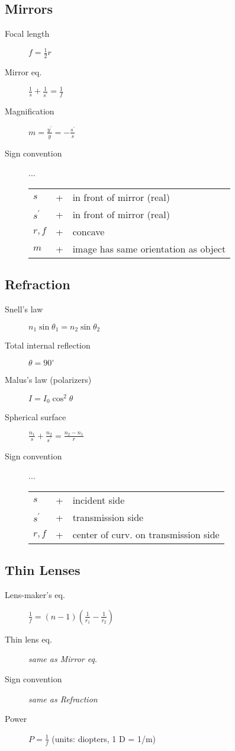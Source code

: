 \documentclass{article}
\newcommand{\bd}{\begin{description}}
\newcommand{\ed}{\end{description}}
\begin{document}
\subsection{Mirrors}
\bd
 \item[Focal length] $ f = \frac{1}{2} r $
 \item[Mirror eq.] $ \frac{1}{s} + \frac{1}{s^\prime} = \frac{1}{f} $
 \item[Magnification] $ m = \frac{y^\prime}{y} = - \frac{s^\prime}{s} $
 \item[Sign convention] ...\newline
  \begin{tabular}{lll}
   $s$ & + & in front of mirror (real) \\
   $s^\prime$ & + & in front of mirror (real) \\
   $r,f$ & + & concave \\
   $m$ & + & image has same orientation as object
  \end{tabular}
\ed

\subsection{Refraction}
\bd
 \item[Snell's law] $ n_1 \sin\theta_1 = n_2 \sin\theta_2 $
 \item[Total internal reflection] $ \theta = 90^\circ $
 \item[Malus's law (polarizers)] $ I = I_0 \cos^2 \theta $
 \item[Spherical surface] $ \frac{n_1}{s} + \frac{n_2}{s^\prime} = \frac{n_2 - n_1}{r} $
 \item[Sign convention] ...\newline
  \begin{tabular}{lll}
   $s$ & + & incident side \\
   $s^\prime$ & + & transmission side \\
   $r,f$ & + & center of curv. on transmission side
  \end{tabular}
\ed

\subsection{Thin Lenses}
\bd
 \item[Lens-maker's eq.] $ \frac{1}{f} = (n-1)\left(\frac{1}{r_1} - \frac{1}{r_2}\right) $
 \item[Thin lens eq.] {\it same as Mirror eq.}
 \item[Sign convention] {\it same as Refraction}
 \item[Power] $ P = \frac{1}{f} $ (units: diopters, 1 D = 1/m)
\ed
\end{document}
